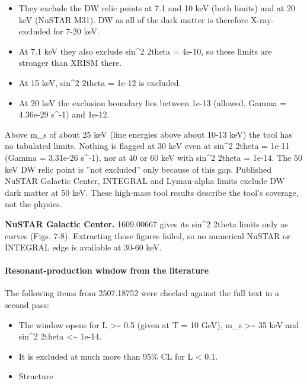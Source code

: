 \documentclass[11pt,a4paper]{article}
\begin{document}
\begin{itemize}
  \item They exclude the DW relic points at 7.1 and 10 keV (both limits) and at 20 keV (NuSTAR M31). DW as all of the dark matter is therefore X-ray-excluded for 7-20 keV.
  \item At 7.1 keV they also exclude sin\textasciicircum{}2 2theta = 4e-10, so these limits are stronger than XRISM there.
  \item At 15 keV, sin\textasciicircum{}2 2theta = 1e-12 is excluded.
  \item At 20 keV the exclusion boundary lies between 1e-13 (allowed, Gamma = 4.36e-29 s\textasciicircum{}-1) and 1e-12.
\end{itemize}
Above m\_s of about 25 keV (line energies above about 10-13 keV) the tool has no tabulated limits. Nothing is flagged at 30 keV even at sin\textasciicircum{}2 2theta = 1e-11 (Gamma = 3.31e-26 s\textasciicircum{}-1), nor at 40 or 60 keV with sin\textasciicircum{}2 2theta = 1e-14. The 50 keV DW relic point is ''not excluded'' only because of this gap. Published NuSTAR Galactic Center, INTEGRAL and Lyman-alpha limits exclude DW dark matter at 50 keV. These high-mass tool results describe the tool's coverage, not the physics.

\textbf{NuSTAR Galactic Center.} 1609.00667 gives its sin\textasciicircum{}2 2theta limits only as curves (Figs. 7-8). Extracting those figures failed, so no numerical NuSTAR or INTEGRAL edge is available at 30-60 keV.

\paragraph{Resonant-production window from the literature}
The following items from 2507.18752 were checked against the full text in a second pass:

\begin{itemize}
  \item The window opens for L \textgreater{}\textasciitilde{} 0.5 (given at T = 10 GeV), m\_s \textgreater{}\textasciitilde{} 35 keV and sin\textasciicircum{}2 2theta \textless{}\textasciitilde{} 1e-14.
  \item It is excluded at much more than 95\% CL for L \textless{} 0.1.
  \item Structure
\end{itemize}
\end{document}
